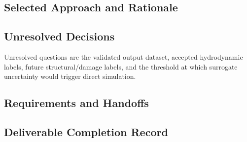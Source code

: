 \subsection{Selected Approach and Rationale}
\label{sec:res-ml-rol-selected-approach}


\subsection{Unresolved Decisions}
\label{sec:res-ml-rol-unresolved-decisions}

Unresolved questions are the validated output dataset, accepted
hydrodynamic labels, future structural/damage labels, and the
threshold at which surrogate uncertainty would trigger direct
simulation.

\subsection{Requirements and Handoffs}
\label{sec:res-ml-rol-requirements}


\subsection{Deliverable Completion Record}
\label{sec:res-ml-rol-completion-record}

%
%
%
